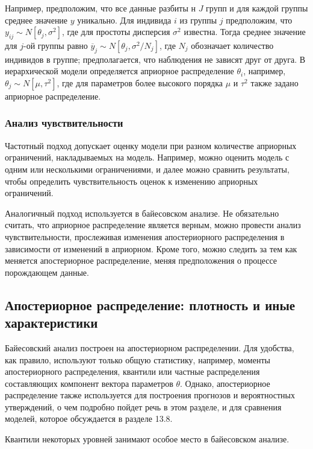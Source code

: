 Например, предположим, что все данные разбиты н $J$ групп и для каждой группы среднее значение $y$ уникально. Для индивида $i$ из группы $j$ предположим, что $y_{ij}{\sim}N[\theta_j,\sigma^2]$, где для простоты дисперсия $\sigma^2$ известна. Тогда среднее значение для $j$-ой группы равно $\overline{y}_j{\sim}N[\theta_j,\sigma^{2}/N_j]$, где $N_j$ обозначает количество индивидов в группе; предполагается, что наблюдения не зависят друг от друга. В иерархической модели определяется априорное распределение $\theta_i$, например, $\theta_{j}{\sim}N[\mu, \tau^2]$, где для параметров более высокого порядка $\mu$ и $\tau^2$ также задано априорное распределение.


\subsubsection*{Анализ чувствительности}


Частотный подход  допускает оценку модели при разном количестве априорных ограничений, накладываемых на модель. Например, можно оценить модель с одним или несколькими ограничениями, и далее можно сравнить результаты, чтобы определить чувствительность оценок к изменению априорных ограничений.


Аналогичный подход используется в байесовском анализе. Не обязательно считать, что априорное распределение является верным, можно провести анализ чувствительности, прослеживая изменения апостериорного распределения в зависимости от изменений в априорном. Кроме того, можно следить за тем как меняется апостериорное распределение, меняя предположения о процессе порождающем данные. 

\subsection{Апостериорное распределение: плотность и иные характеристики}

Байесовский анализ построен на апостериорном распределении. Для удобства, как правило, используют только общую статистику, например, моменты апостериорного распределения, квантили или частные распределения составляющих компонент вектора параметров $\theta$. Однако, апостериорное распределение также используется для построения прогнозов и вероятностных утверждений, о чем подробно пойдет речь в этом разделе, и для сравнения моделей, которое обсуждается в разделе 13.8.

Квантили некоторых уровней занимают особое место в байесовском анализе.

